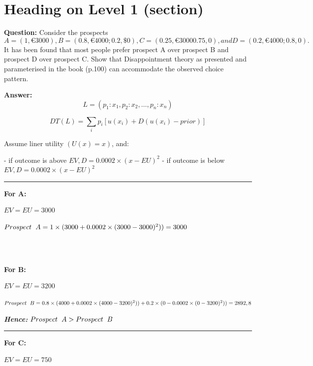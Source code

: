 \documentclass{article}
\begin{document}
\section{Heading on Level 1 (section)}
\textbf{Question:}
Consider the prospects
\begin{equation}
A = (1, €3000), B = (0.8, €4000; 0.2, \$0), C = (0.25, €3000 0.75, 0), and D = (0.2, €4000; 0.8, 0).
\end{equation}
It has been found that most people prefer prospect A over prospect B and prospect D over prospect C. Show that Disappointment theory
as presented and parameterised in the book (p.100) can accommodate the observed choice pattern. 

\textbf{Answer:}
\begin{equation}
L = (p_1: x_1, p_2: x_2, \ldots , p_n: x_n )
\end{equation}

\begin{equation}
DT(L) = \sum_i p_i [u(x_i) + D(u(x_i)- prior)]
\end{equation}

Assume liner utility $(U(x) = x)$, and:

- if outcome is above $EV, D=0.0002\times(x-EU)^2$
- if outcome is below $EV, D=0.0002\times(x-EU)^2$


\rule{\textwidth}{1pt}

\begin{flushleft}
\textbf{For A:}
\end{flushleft}
$EV=EU=3000$

$Prospect \hspace{2mm} A = 1 \times (3000 + 0.0002 \times (3000 - 3000)^2)) = 3000$

\\
\\

\begin{flushleft}
\color{red}
\textbf{For B:}
\end{flushleft}
$EV=EU=3200$

$Prospect \hspace{2mm} B = 0.8 \times (4000 + 0.0002 \times (4000 - 3200)^2)) + 0.2 \times (0 - 0.0002 \times (0 - 3200)^2)) = 2892,8$

\textbf{\textit{Hence:}} $Prospect \hspace{2mm} A > Prospect \hspace{2mm} B$

\rule{\textwidth}{1pt}

\begin{flushleft}
\textbf{For C:}
\end{flushleft}
$EV=EU=750$
\end{document}
